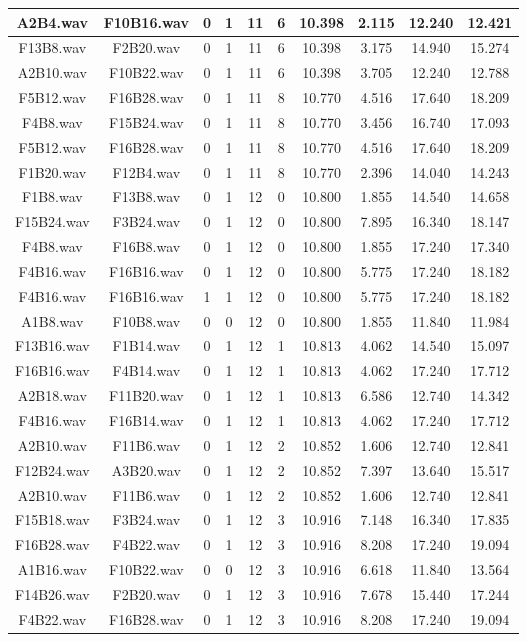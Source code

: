 \documentclass[11pt,a4paper]{book}
\begin{document}
\begin{longtable}[c]{|c|c|c|c|c|c|c|c|c|c|}
A2B4.wav&F10B16.wav&0&1&11&6&10.398&2.115&12.240&12.421\\ \hline
F13B8.wav&F2B20.wav&0&1&11&6&10.398&3.175&14.940&15.274\\ \hline
A2B10.wav&F10B22.wav&0&1&11&6&10.398&3.705&12.240&12.788\\ \hline
F5B12.wav&F16B28.wav&0&1&11&8&10.770&4.516&17.640&18.209\\ \hline
F4B8.wav&F15B24.wav&0&1&11&8&10.770&3.456&16.740&17.093\\ \hline
F5B12.wav&F16B28.wav&0&1&11&8&10.770&4.516&17.640&18.209\\ \hline
F1B20.wav&F12B4.wav&0&1&11&8&10.770&2.396&14.040&14.243\\ \hline
F1B8.wav&F13B8.wav&0&1&12&0&10.800&1.855&14.540&14.658\\ \hline
F15B24.wav&F3B24.wav&0&1&12&0&10.800&7.895&16.340&18.147\\ \hline
F4B8.wav&F16B8.wav&0&1&12&0&10.800&1.855&17.240&17.340\\ \hline
F4B16.wav&F16B16.wav&0&1&12&0&10.800&5.775&17.240&18.182\\ \hline
F4B16.wav&F16B16.wav&1&1&12&0&10.800&5.775&17.240&18.182\\ \hline
A1B8.wav&F10B8.wav&0&0&12&0&10.800&1.855&11.840&11.984\\ \hline
F13B16.wav&F1B14.wav&0&1&12&1&10.813&4.062&14.540&15.097\\ \hline
F16B16.wav&F4B14.wav&0&1&12&1&10.813&4.062&17.240&17.712\\ \hline
A2B18.wav&F11B20.wav&0&1&12&1&10.813&6.586&12.740&14.342\\ \hline
F4B16.wav&F16B14.wav&0&1&12&1&10.813&4.062&17.240&17.712\\ \hline
A2B10.wav&F11B6.wav&0&1&12&2&10.852&1.606&12.740&12.841\\ \hline
F12B24.wav&A3B20.wav&0&1&12&2&10.852&7.397&13.640&15.517\\ \hline
A2B10.wav&F11B6.wav&0&1&12&2&10.852&1.606&12.740&12.841\\ \hline
F15B18.wav&F3B24.wav&0&1&12&3&10.916&7.148&16.340&17.835\\ \hline
F16B28.wav&F4B22.wav&0&1&12&3&10.916&8.208&17.240&19.094\\ \hline
A1B16.wav&F10B22.wav&0&0&12&3&10.916&6.618&11.840&13.564\\ \hline
F14B26.wav&F2B20.wav&0&1&12&3&10.916&7.678&15.440&17.244\\ \hline
F4B22.wav&F16B28.wav&0&1&12&3&10.916&8.208&17.240&19.094\\ \hline

\end{longtable}
\end{document}

